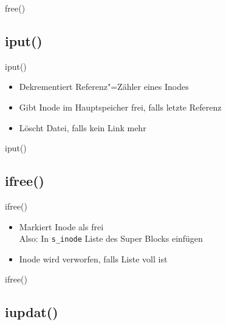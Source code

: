 \documentclass{beamer}
\begin{document}
\begin{frame}{free()}
\end{frame}




\subsection{iput()}

\begin{frame}{iput()}
    \begin{itemize}
        \item Dekrementiert Referenz"=Zähler eines Inodes
        \item Gibt Inode im Hauptspeicher frei, falls letzte Referenz
        \item Löscht Datei, falls kein Link mehr
    \end{itemize}
\end{frame}

\begin{frame}{iput()}
\end{frame}




\subsection{ifree()}

\begin{frame}{ifree()}
    \begin{itemize}
        \item Markiert Inode als frei\\
            Also: In \texttt{s\_inode} Liste des Super Blocks einfügen
        \medskip
        \item Inode wird verworfen, falls Liste voll ist
    \end{itemize}
\end{frame}

\begin{frame}{ifree()}
\end{frame}




\subsection{iupdat()}
\end{document}
